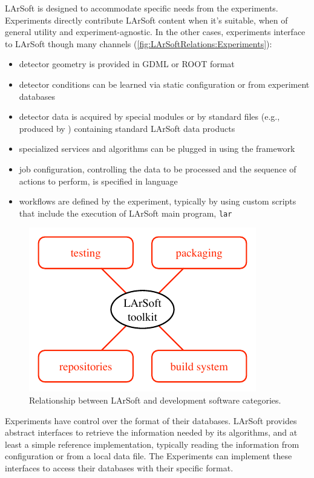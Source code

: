 LArSoft is designed to accommodate specific needs from the experiments.
Experiments directly contribute LArSoft content when it's suitable,
\ie when of general utility and experiment-agnostic.
In the other cases, experiments interface to LArSoft though many channels
(\cref{fig:LArSoftRelations:Experiments}):
\begin{itemize}
   \item detector geometry is provided in GDML or ROOT format
   \item detector conditions can be learned via static configuration or from experiment databases
   \item detector data is acquired by special \ART modules or by standard \ART files (e.g., produced by \ARTDAQ) containing standard LArSoft data products
   \item specialized services and algorithms can be plugged in using the \ART framework
   \item job configuration, controlling the data to be processed and the sequence of actions to perform,
      is specified in \FHiCL language~\cite{FHiCL}
   \item workflows are defined by the experiment, typically by using custom scripts that include the execution of LArSoft main program, \texttt{lar}
\end{itemize}
\begin{figure}
   \centering\includegraphics{figures/LArSoftDevelopmentRunTime}
   \caption[Relationship between LArSoft and development software categories]{
      \label{fig:LArSoftRelations:Development}
      Relationship between LArSoft and development software categories.
   }
\end{figure}
Experiments have control over the format of their databases.
LArSoft provides abstract interfaces to retrieve the information needed by its algorithms,
and at least a simple reference implementation,
typically reading the information from configuration or from a local data file.
The Experiments can implement these interfaces to access their databases with their specific format.


